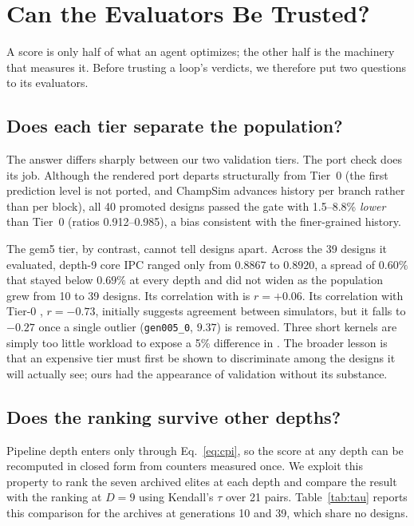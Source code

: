 \documentclass[conference]{IEEEtran}
\newcommand{\vfs}{\text{VFS}}
\newcommand{\mpki}{\text{MPKI}}
\begin{document}
\section{Can the Evaluators Be Trusted?}
\label{sec:res}

A score is only half of what an agent optimizes; the other half is the
machinery that measures it. Before trusting a loop's verdicts, we therefore put
two questions to its evaluators.

\subsection{Does each tier separate the population?}

The answer differs sharply between our two validation tiers. The port check
does its job. Although the rendered port departs structurally from Tier~0 (the
first prediction level is not ported, and ChampSim advances history per branch
rather than per block), all 40 promoted designs passed the gate with \mpki{}
1.5--8.8\% \emph{lower} than Tier~0 (ratios 0.912--0.985), a bias consistent
with the finer-grained history.

The gem5 tier, by contrast, cannot tell designs apart. Across the 39 designs it
evaluated, depth-9 core IPC ranged only from $0.8867$ to $0.8920$, a spread of
$0.60\%$ that stayed below $0.69\%$ at every depth and did not widen as the
population grew from 10 to 39 designs. Its correlation with \vfs{} is $r=+0.06$.
Its correlation with Tier-0 \mpki{}, $r=-0.73$, initially suggests agreement
between simulators, but it falls to $-0.27$ once a single outlier
(\texttt{gen005\_0}, \mpki{} $9.37$) is removed. Three short kernels are simply
too little workload to expose a 5\% difference in \mpki{}. The broader lesson is
that an expensive tier must first be shown to discriminate among the designs it
will actually see; ours had the appearance of validation without its substance.

\subsection{Does the ranking survive other depths?}

Pipeline depth enters \vfs{} only through Eq.~\eqref{eq:cpi}, so the score at
any depth can be recomputed in closed form from counters measured once. We
exploit this property to rank the seven archived elites at each depth and
compare the result with the ranking at $D=9$ using Kendall's $\tau$ over 21
pairs. Table~\ref{tab:tau} reports this comparison for the archives at
generations 10 and 39, which share no designs.
\end{document}
